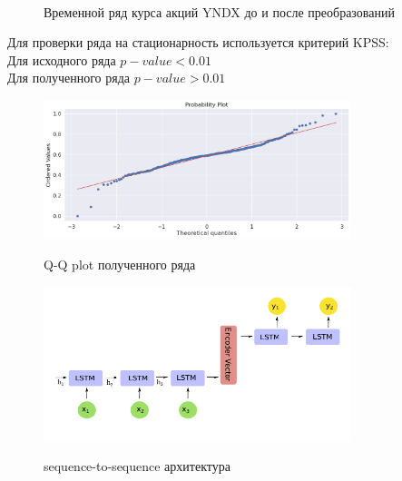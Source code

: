 \begin{figure}[h!t]\center
{}
\\
\caption{Временной ряд курса акций YNDX до и после преобразований}
\end{figure}

Для проверки ряда на стационарность используется критерий KPSS: \\
Для исходного ряда $p-value < 0.01$ \\
Для полученного ряда $p-value > 0.01$ \\

\begin{figure}[h!t]\center
{\includegraphics[width=0.8\textwidth]{results/qqplot.png}}
\caption{Q-Q plot полученного ряда}
\end{figure}

\begin{figure}[h!t]\center
{\includegraphics[width=0.8\textwidth]{results/seq2seq.png}}
\caption{sequence-to-sequence архитектура}
\end{figure}

